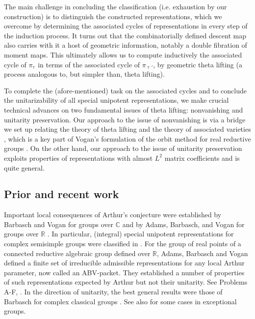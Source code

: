 \documentclass[11pt,a4paper]{amsart}
\newcommand{\BC}{{\mathbb {C}}}
\newcommand{\BR}{{\mathbb {R}}}
\numberwithin{equation}{section}
\theoremstyle{remark}
\begin{document}
The main challenge in concluding the classification (i.e. exhaustion by our construction) is to distinguish the constructed representations, which we overcome by determining the associated cycles of representations \cite{Vo89} in every step of the induction process. It turns out that the combinatorially defined descent map also carries with it a host of geometric information, notably a double fibration of moment maps. This ultimately allows us to compute inductively the associated cycle of $\pi_{\uptau}$ in terms of the associated cycle of $\pi_{\uptau'}$, by geometric theta lifting (a process analogous to, but simpler than, theta lifting).

To complete the (afore-mentioned) task on the associated cycles and to conclude the unitarizability of all special unipotent representations, we make crucial technical advances  on two fundamental issues of theta lifting: nonvanishing and unitarity preservation. Our approach to the issue of nonvanishing is via a  bridge we set up relating the theory of theta lifting and the theory of associated varieties \cite{Vo89}, which is a key part of Vogan’s formulation of the orbit method for real reductive groups \cite{VoBook,Vo98}. On the other hand, our approach to the issue of unitarity preservation exploits properties of representations with almost $L^2$ matrix coefficients \cite{CHH} and is quite general.


\subsection{Prior and recent work}

Important local consequences of Arthur's conjecture were established by Barbasch and Vogan for groups over $\BC$ \cite{BVUni} and by Adams, Barbasch, and Vogan for groups over $\BR$ \cite{ABV}. In particular, (integral) special unipotent representations for complex semisimple groups were classified in \cite{BVUni}. For the group of real points of a connected reductive algebraic group defined over $\BR$, Adams, Barbasch and Vogan defined a finite set of irreducible admissible representations for any local Arthur parameter, now called an ABV-packet. They established a number of properties of such representations expected by Arthur but not their unitarity. See Problems A-F, \cite{ABV}. In the direction of unitarity, the best general results were those of Barbasch for complex classical groups \cite{B.Class}. See also \cite{Mil} for some cases in exceptional groups.
\end{document}
